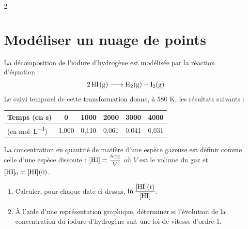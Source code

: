\documentclass[a4paper,11pt,fleqn]{article}%
\begin{document}
\begin{multicols}{2}
\section{Modéliser un nuage de points}
La décomposition de l'iodure d'hydrogène est modélisée par la réaction d'équation :
\begin{eqnarray}
    \ce{2HI(g) -> H2(g) + I2(g)}\nonumber
\end{eqnarray}
Le suivi temporel de cette transformation donne, à \num{580} \unit{\kelvin}, les résultats suivants :
\begin{center}
    \begin{tabular}{|>{\centering}m{.15\linewidth}|c|c|c|c|c|}
    \hline Temps (en s) & 0 & 1000 & 2000 & 3000 & 4000\\
    \hline [\ce{HI}] (en \unit{\mole\per\liter}) & 1,000 & 0,110 & 0,061 & 0,041 & 0,031\\
    \hline
    \end{tabular}
\end{center}
La concentration en quantité de matière d'une espèce gazeuse est définir comme celle d'une espèce dissoute : $[\ce{HI}] = \dfrac{n_{\ce{HI}}}{V}$ où $V$ est le volume du gaz et $[\ce{HI}]_0 = [\ce{HI}](0)$.
\begin{enumerate}
    \item Calculer, pour chaque date ci-dessus, $\ln{\dfrac{[\ce{HI}](t)}{[\ce{HI}]}}$.
    \item À l'aide d'une représentation graphique, déterminer si l'évolution de la concentration du iodure d'hydrogène suit une loi de vitesse d'ordre 1.
\end{enumerate}


\end{multicols}
\end{document}
